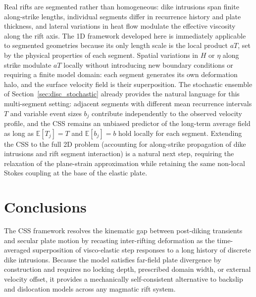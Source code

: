 \documentclass[extra]{gji}
\begin{document}
Real rifts are segmented rather than homogeneous: dike intrusions span finite
along-strike lengths, individual segments differ in recurrence history and
plate thickness, and lateral variations in heat flow modulate the effective
viscosity along the rift axis.  The 1D framework developed here is
immediately applicable to segmented geometries because its only length scale
is the local product $aT$, set by the physical properties of each segment.
Spatial variations in $H$ or $\eta$ along strike modulate $aT$ locally
without introducing new boundary conditions or requiring a finite model
domain: each segment generates its own deformation halo, and the surface
velocity field is their superposition.  The stochastic ensemble of
Section~\ref{sec:disc_stochastic} already provides the natural language for
this multi-segment setting: adjacent segments with different mean recurrence
intervals $T$ and variable event sizes $b_j$ contribute independently to
the observed velocity profile, and the CSS remains an unbiased predictor of
the long-term average field as long as $\mathbb{E}[T_j] = T$ and
$\mathbb{E}[b_j] = b$ hold locally for each segment.  Extending
the CSS to the full 2D problem (accounting for along-strike propagation
of dike intrusions and rift segment interaction) is a natural next step,
requiring the relaxation of the plane-strain approximation while retaining
the same non-local Stokes coupling at the base of the elastic plate.

\section{Conclusions}
\label{sec:conclusions}

The CSS framework resolves the kinematic gap between post-diking transients
and secular plate motion by recasting inter-rifting deformation as the
time-averaged superposition of visco-elastic step responses to a long history
of discrete dike intrusions.  Because the model satisfies far-field plate
divergence by construction and requires no locking depth, prescribed domain
width, or external velocity offset, it provides a mechanically self-consistent
alternative to backslip and dislocation models across any magmatic rift system.
\end{document}
